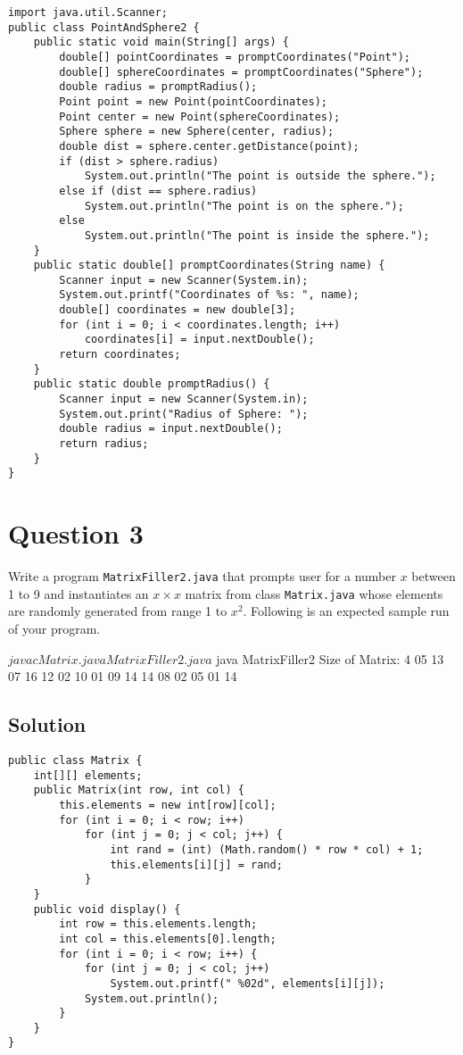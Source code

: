 \documentclass[12pt,letterpaper,twoside]{article}
\begin{document}
\lstset{language=Java,tabsize=4}
\begin{lstlisting}
import java.util.Scanner;
public class PointAndSphere2 {
	public static void main(String[] args) {
		double[] pointCoordinates = promptCoordinates("Point");
		double[] sphereCoordinates = promptCoordinates("Sphere");
		double radius = promptRadius();
		Point point = new Point(pointCoordinates);
		Point center = new Point(sphereCoordinates);
		Sphere sphere = new Sphere(center, radius);
		double dist = sphere.center.getDistance(point);
		if (dist > sphere.radius)
			System.out.println("The point is outside the sphere.");
		else if (dist == sphere.radius)
			System.out.println("The point is on the sphere.");
		else
			System.out.println("The point is inside the sphere.");
	}
	public static double[] promptCoordinates(String name) {
		Scanner input = new Scanner(System.in);
		System.out.printf("Coordinates of %s: ", name);
		double[] coordinates = new double[3];
		for (int i = 0; i < coordinates.length; i++)
			coordinates[i] = input.nextDouble();
		return coordinates;
	}
	public static double promptRadius() {
		Scanner input = new Scanner(System.in);
		System.out.print("Radius of Sphere: ");
		double radius = input.nextDouble();
		return radius;
	}
}
\end{lstlisting}

\newpage

\section*{Question 3}

Write a program \texttt{MatrixFiller2.java} that prompts user for a number $x$ between 1 to 9 and instantiates an $x \times x$ matrix from class \texttt{Matrix.java} whose elements are randomly generated from range 1 to $x^2$.
Following is an expected sample run of your program.

\begin{terminal}
$ javac Matrix.java MatrixFiller2.java
$ java MatrixFiller2
Size of Matrix: 4
 05 13 07 16
 12 02 10 01
 09 14 14 08
 02 05 01 14
\end{terminal}

\subsection*{Solution}

\lstset{language=Java,tabsize=4}
\begin{lstlisting}
public class Matrix {
	int[][] elements;
	public Matrix(int row, int col) {
		this.elements = new int[row][col];
		for (int i = 0; i < row; i++)
			for (int j = 0; j < col; j++) {
				int rand = (int) (Math.random() * row * col) + 1;
				this.elements[i][j] = rand;
			}
	}
	public void display() {
		int row = this.elements.length;
		int col = this.elements[0].length;
		for (int i = 0; i < row; i++) {
			for (int j = 0; j < col; j++)
				System.out.printf(" %02d", elements[i][j]);
			System.out.println();
		}
	}
}
\end{lstlisting}
\end{document}
